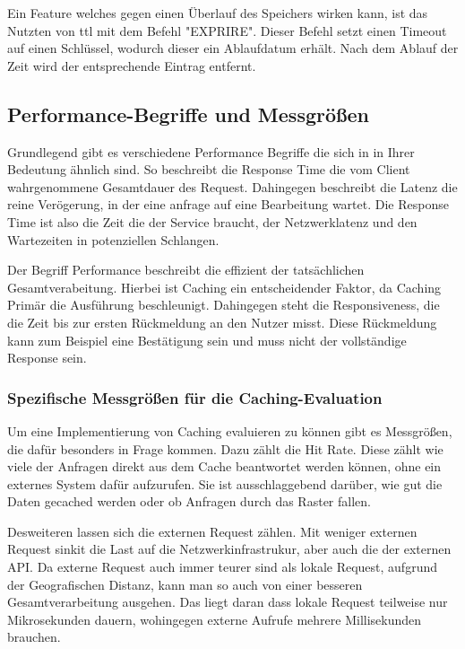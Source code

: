 Ein Feature welches gegen einen Überlauf des Speichers wirken kann, ist das Nutzten von \ac{ttl} mit dem Befehl "EXPRIRE". Dieser Befehl setzt einen Timeout auf einen Schlüssel, wodurch dieser ein Ablaufdatum erhält. Nach dem Ablauf der Zeit wird der entsprechende Eintrag entfernt. %

\subsection{Performance-Begriffe und Messgrößen}

Grundlegend gibt es verschiedene Performance Begriffe die sich in in Ihrer Bedeutung ähnlich sind. So beschreibt die Response Time die vom Client wahrgenommene Gesamtdauer des Request. Dahingegen beschreibt die Latenz die reine Verögerung, in der eine anfrage auf eine Bearbeitung wartet. %
Die Response Time ist also die Zeit die der Service braucht, der Netzwerklatenz und den Wartezeiten in potenziellen Schlangen.

Der Begriff Performance beschreibt die effizient der tatsächlichen Gesamtverabeitung. Hierbei ist Caching ein entscheidender Faktor, da Caching Primär die Ausführung beschleunigt. Dahingegen steht die Responsiveness, die die Zeit bis zur ersten Rückmeldung an den Nutzer misst. Diese Rückmeldung kann zum Beispiel eine Bestätigung sein und muss nicht der vollständige Response sein. %

\subsubsection{Spezifische Messgrößen für die Caching-Evaluation}

Um eine Implementierung von Caching evaluieren zu können gibt es Messgrößen, die dafür besonders in Frage kommen. Dazu zählt die Hit Rate. Diese zählt wie viele der Anfragen direkt aus dem Cache beantwortet werden können, ohne ein externes System dafür aufzurufen. Sie ist ausschlaggebend darüber, wie gut die Daten gecached werden oder ob Anfragen durch das Raster fallen. %

Desweiteren lassen sich die externen Request zählen. Mit weniger externen Request sinkit die Last auf die Netzwerkinfrastrukur, aber auch die der externen API. %
Da externe Request auch immer teurer sind als lokale Request, aufgrund der Geografischen Distanz, kann man so auch von einer besseren Gesamtverarbeitung ausgehen. Das liegt daran dass lokale Request teilweise nur Mikrosekunden dauern, wohingegen externe Aufrufe mehrere Millisekunden brauchen. %


